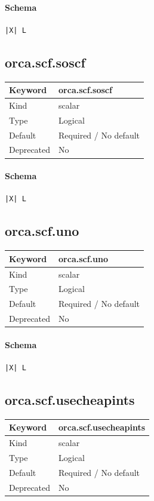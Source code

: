\documentclass[11pt]{article}
\begin{document}
{{{{{\paragraph{Schema}
\begin{Verbatim}
|X| L
\end{Verbatim}

\subsection{orca.scf.soscf}
\label{kw:orca-scf-soscf}
\begin{longtable}{|p{1.5in}|p{4.5in}|}
\hline
Keyword & orca.scf.soscf \\
\hline
Kind & scalar \\
\hline
Type & Logical \\
\hline
Default & Required / No default \\
\hline
Deprecated & No \\
\hline
\end{longtable}
\paragraph{Schema}
\begin{Verbatim}
|X| L
\end{Verbatim}

\subsection{orca.scf.uno}
\label{kw:orca-scf-uno}
\begin{longtable}{|p{1.5in}|p{4.5in}|}
\hline
Keyword & orca.scf.uno \\
\hline
Kind & scalar \\
\hline
Type & Logical \\
\hline
Default & Required / No default \\
\hline
Deprecated & No \\
\hline
\end{longtable}
\paragraph{Schema}
\begin{Verbatim}
|X| L
\end{Verbatim}

\subsection{orca.scf.usecheapints}
\label{kw:orca-scf-usecheapints}
\begin{longtable}{|p{1.5in}|p{4.5in}|}
\hline
Keyword & orca.scf.usecheapints \\
\hline
Kind & scalar \\
\hline
Type & Logical \\
\hline
Default & Required / No default \\
\hline
Deprecated & No \\
\hline
\end{longtable}
}}}}}
\end{document}
